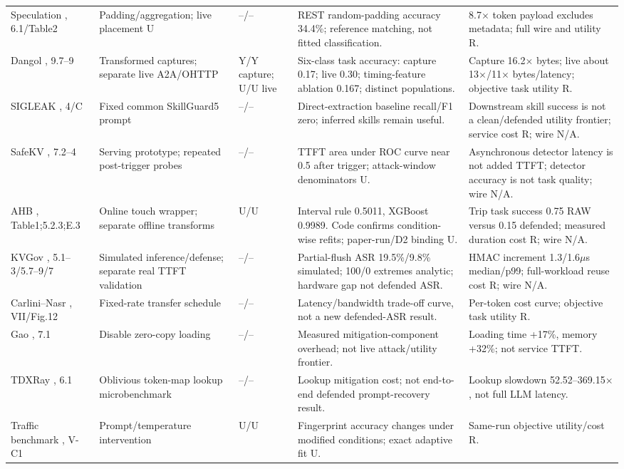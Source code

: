 \begin{table}[tp]
\begin{tabularx}{\textwidth}{@{}p{}p{}p{}YY@{}}
Speculation \cite{wei2024speculation}, 6.1/Table2 & Padding/aggregation; live placement U & --/-- & REST random-padding accuracy 34.4\%; reference matching, not fitted classification. & 8.7$\times$ token payload excludes metadata; full wire and utility R. \\
Dangol \cite{dangol2026workflow}, 9.7--9 & Transformed captures; separate live A2A/OHTTP & Y/Y capture; U/U live & Six-class task accuracy: capture 0.17; live 0.30; timing-feature ablation 0.167; distinct populations. & Capture 16.2$\times$ bytes; live about 13$\times$/11$\times$ bytes/latency; objective task utility R. \\
SIGLEAK \cite{geng2026sigleak}, 4/C & Fixed common SkillGuard5 prompt & --/-- & Direct-extraction baseline recall/F1 zero; inferred skills remain useful. & Downstream skill success is not a clean/defended utility frontier; service cost R; wire N/A. \\
SafeKV \cite{chu2025safekv}, 7.2--4 & Serving prototype; repeated post-trigger probes & --/-- & TTFT area under ROC curve near 0.5 after trigger; attack-window denominators U. & Asynchronous detector latency is not added TTFT; detector accuracy is not task quality; wire N/A. \\
AHB \cite{zhu2026turing}, Table1;5.2.3;E.3 & Online touch wrapper; separate offline transforms & U/U & Interval rule 0.5011, XGBoost 0.9989. Code confirms condition-wise refits; paper-run/D2 binding U. & Trip task success 0.75 RAW versus 0.15 defended; measured duration cost R; wire N/A. \\
KVGov \cite{addagada2026kvgov}, 5.1--3/5.7--9/7 & Simulated inference/defense; separate real TTFT validation & --/-- & Partial-flush ASR 19.5\%/9.8\% simulated; 100/0 extremes analytic; hardware gap not defended ASR. & HMAC increment 1.3/1.6$\mu$s median/p99; full-workload reuse cost R; wire N/A. \\
Carlini--Nasr \cite{carlini2024remote}, VII/Fig.12 & Fixed-rate transfer schedule & --/-- & Latency/bandwidth trade-off curve, not a new defended-ASR result. & Per-token cost curve; objective task utility R. \\
Gao \cite{gao2025iknow}, 7.1 & Disable zero-copy loading & --/-- & Measured mitigation-component overhead; not live attack/utility frontier. & Loading time +17\%, memory +32\%; not service TTFT. \\
TDXRay \cite{hornetz2026tdxray}, 6.1 & Oblivious token-map lookup microbenchmark & --/-- & Lookup mitigation cost; not end-to-end defended prompt-recovery result. & Lookup slowdown 52.52--369.15$\times$, not full LLM latency. \\
Traffic benchmark \cite{pouryousef2026traffic}, V-C1 & Prompt/temperature intervention & U/U & Fingerprint accuracy changes under modified conditions; exact adaptive fit U. & Same-run objective utility/cost R. \\
\bottomrule
\end{tabularx}
\end{table}
